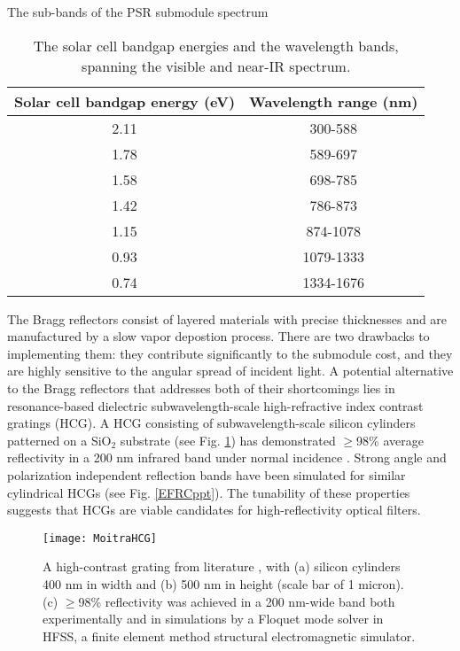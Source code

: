 \documentclass{article}
\begin{document}
\begin{table}[h]
\begin{center}
\caption{The sub-bands of the PSR submodule spectrum}
\label{subbands}
\begin{tabular}{|c|c|}
\hline
Solar cell bandgap energy (eV) & Wavelength range (nm) \\ \hline
2.11                           & 300-588                      \\
1.78                           & 589-697                      \\
1.58                           & 698-785                      \\
1.42                           & 786-873                      \\
1.15                           & 874-1078                     \\
0.93                           & 1079-1333                    \\
0.74                           & 1334-1676                    \\ \hline
\end{tabular}
\end{center}
\caption*{The solar cell bandgap energies and the wavelength bands, spanning the visible and near-IR spectrum.}
\end{table}



The Bragg reflectors consist of layered materials with precise thicknesses and are manufactured by a slow vapor depostion process. There are two drawbacks to implementing them: they contribute significantly to the submodule cost, and they are highly sensitive to the angular spread of incident light. A potential alternative to the Bragg reflectors that addresses both of their shortcomings lies in resonance-based dielectric subwavelength-scale high-refractive index contrast gratings (HCG). A HCG consisting of subwavelength-scale silicon cylinders patterned on a SiO$_2$ substrate (see Fig. \ref{Moitra cylinders}) has demonstrated $\geq$98\% average reflectivity in a 200 nm infrared band under normal incidence \cite{Moitra1}. Strong angle and polarization independent reflection bands have been simulated for similar cylindrical HCGs (see Fig. \ref{EFRCppt}). The tunability of these properties suggests that HCGs are viable candidates for high-reflectivity optical filters. 

\begin{figure}[h]
	\centering
	\texttt{[image: MoitraHCG]}
	\caption{A high-contrast grating from literature \cite{Moitra1}, with (a) silicon cylinders 400 nm in width and (b) 500 nm in height (scale bar of 1 micron). (c) $\ge$98\% reflectivity was achieved in a 200 nm-wide band both experimentally and in simulations by a Floquet mode solver in HFSS, a finite element method structural electromagnetic simulator.}
	\label{Moitra cylinders}
\end{figure}
\end{document}
